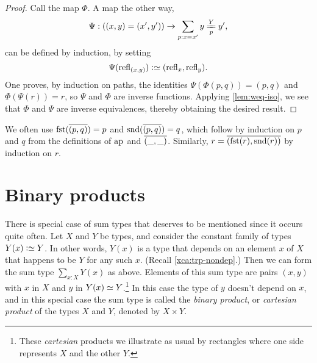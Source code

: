 \begin{proof}
  Call the map $\Phi$.
  A map the other way,
  \[
    \Psi : ((x,y) = (x',y')) \to \sum_{p:x=x'} \pathover y Y p {y'},
  \]
  can be defined by induction, by setting
  \[
    \Psi (\refl {(x,y)}) \defeq (\refl x, \refl y).
  \]
  One proves, by induction on paths, the identities $ \Psi ( \Phi (p,q) ) = (p,q) $ and $ \Phi (\Psi ( r )) = r$, so $\Psi$ and $\Phi$ are inverse functions.
  Applying \cref{lem:weq-iso}, we see that $\Phi$ and $\Psi$ are inverse equivalences, thereby obtaining the desired result.
\end{proof}

We often use $\fst(\pathpair p q) = p$ and $\snd(\pathpair p q) = q$,
which follow by induction on $p$ and $q$ from the definitions of $\ap{}$ and $\overline{({\_},{\_})}$.
Similarly, $r=\pathpair {\fst(r)}{\snd(r)}$ by induction on $r$.

\section{Binary products}
\label{sec:binprod-types}

There is special case of sum types that deserves to be mentioned since
it occurs quite often. Let $X$ and $Y$ be types, and consider the constant
family of types $Y(x)\defeq Y$. In other words, $Y(x)$ is a type that depends
on an element $x$ of $X$ that happens to be $Y$ for any such $x$.
(Recall \cref{xca:trp-nondep}.)
Then we can form the sum type $\sum_{x:X} Y(x)$ as above.
Elements of this sum type are pairs $(x,y)$
with $x$ in $X$ and $y$ in $Y(x)\jdeq Y$.\footnote{%
  These \emph{cartesian} products we illustrate as usual
  by rectangles where one side represents $X$ and the other $Y$.\par
  }
In this case the type of $y$
doesn't depend on $x$, and in this special case the sum type is called
the \emph{binary product}, or \emph{cartesian product} of the types $X$ and $Y$,
denoted by $X \times Y$.

